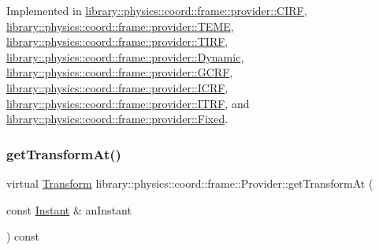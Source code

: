 Implemented in \hyperlink{classlibrary_1_1physics_1_1coord_1_1frame_1_1provider_1_1_c_i_r_f_af75424e9e3a86a5aa06f998a8710c5c2}{library\+::physics\+::coord\+::frame\+::provider\+::\+C\+I\+RF}, \hyperlink{classlibrary_1_1physics_1_1coord_1_1frame_1_1provider_1_1_t_e_m_e_a606d0c4cad7df776e848fd3670e5cc7f}{library\+::physics\+::coord\+::frame\+::provider\+::\+T\+E\+ME}, \hyperlink{classlibrary_1_1physics_1_1coord_1_1frame_1_1provider_1_1_t_i_r_f_a48ef3f686e9bcc744a5e3d1fa1779ab6}{library\+::physics\+::coord\+::frame\+::provider\+::\+T\+I\+RF}, \hyperlink{classlibrary_1_1physics_1_1coord_1_1frame_1_1provider_1_1_dynamic_a9d1c9b905420f026fa2f9c26305e47fd}{library\+::physics\+::coord\+::frame\+::provider\+::\+Dynamic}, \hyperlink{classlibrary_1_1physics_1_1coord_1_1frame_1_1provider_1_1_g_c_r_f_ae32853b62bfe251fd48262b7ab383fc7}{library\+::physics\+::coord\+::frame\+::provider\+::\+G\+C\+RF}, \hyperlink{classlibrary_1_1physics_1_1coord_1_1frame_1_1provider_1_1_i_c_r_f_a06ce5c7c4bc22045d612d951cbeb4d14}{library\+::physics\+::coord\+::frame\+::provider\+::\+I\+C\+RF}, \hyperlink{classlibrary_1_1physics_1_1coord_1_1frame_1_1provider_1_1_i_t_r_f_a0408f17419e49f785863ba7a84865857}{library\+::physics\+::coord\+::frame\+::provider\+::\+I\+T\+RF}, and \hyperlink{classlibrary_1_1physics_1_1coord_1_1frame_1_1provider_1_1_fixed_aa042b90216dd5276ffca2054c93dfc6e}{library\+::physics\+::coord\+::frame\+::provider\+::\+Fixed}.

\mbox{\label{classlibrary_1_1physics_1_1coord_1_1frame_1_1_provider_a796fd2dd337f1304a0e9acf573ce2550}} 
\subsubsection{\texorpdfstring{get\+Transform\+At()}{getTransformAt()}}
{\footnotesize\ttfamily virtual \hyperlink{classlibrary_1_1physics_1_1coord_1_1_transform}{Transform} library\+::physics\+::coord\+::frame\+::\+Provider\+::get\+Transform\+At (\begin{DoxyParamCaption}\item[{const \hyperlink{classlibrary_1_1physics_1_1time_1_1_instant}{Instant} \&}]{an\+Instant }\end{DoxyParamCaption}) const\hspace{0.3cm}{\ttfamily [pure virtual]}}



